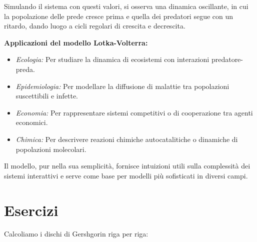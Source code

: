 \documentclass[12pt,a4paper]{article}
\begin{document}
Simulando il sistema con questi valori, si osserva una dinamica oscillante, in cui la popolazione delle prede cresce prima e quella dei predatori segue con un ritardo, dando luogo a cicli regolari di crescita e decrescita.

\vspace{1em}

\textbf{Applicazioni del modello Lotka-Volterra:}

\begin{itemize}
    \item \textit{Ecologia:} Per studiare la dinamica di ecosistemi con interazioni predatore-preda.
    \item \textit{Epidemiologia:} Per modellare la diffusione di malattie tra popolazioni suscettibili e infette.
    \item \textit{Economia:} Per rappresentare sistemi competitivi o di cooperazione tra agenti economici.
    \item \textit{Chimica:} Per descrivere reazioni chimiche autocatalitiche o dinamiche di popolazioni molecolari.
\end{itemize}

Il modello, pur nella sua semplicità, fornisce intuizioni utili sulla complessità dei sistemi interattivi e serve come base per modelli più sofisticati in diversi campi.

\newpage
\section*{Esercizi}


\vspace{1em}

\noindent
Calcoliamo i dischi di Gershgorin riga per riga:
\end{document}
